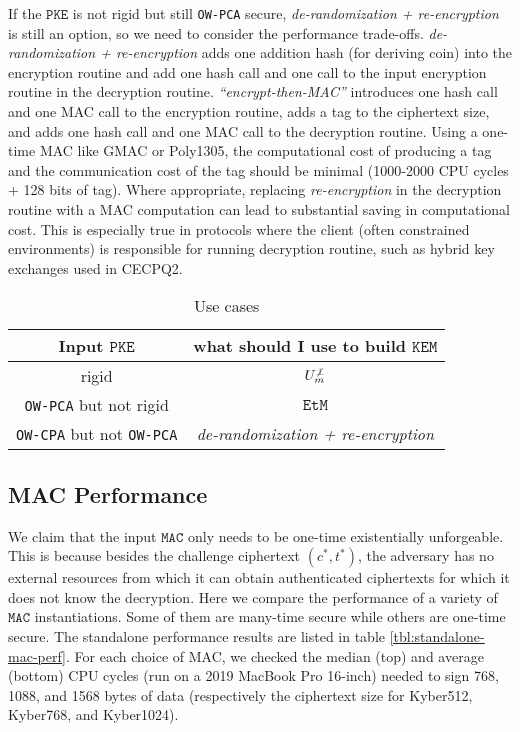 \documentclass[floatrow,journal=tches,submission]{iacrtrans}
\newcommand{\monospace}{\texttt}
\newcommand{\pke}{\monospace{PKE}}
\newcommand{\kem}{\monospace{KEM}}
\newcommand{\etm}{\monospace{EtM}}  %
\newcommand{\mac}{\monospace{MAC}}
\begin{document}
If the $\pke$ is not rigid but still \monospace{OW-PCA} secure, \emph{de-randomization + re-encryption} is still an option, so we need to consider the performance trade-offs. \emph{de-randomization + re-encryption} adds one addition hash (for deriving coin) into the encryption routine and add one hash call and one call to the input encryption routine in the decryption routine. \emph{``encrypt-then-MAC''} introduces one hash call and one MAC call to the encryption routine, adds a tag to the ciphertext size, and adds one hash call and one MAC call to the decryption routine. Using a one-time MAC like GMAC or Poly1305, the computational cost of producing a tag and the communication cost of the tag should be minimal (1000-2000 CPU cycles + 128 bits of tag). Where appropriate, replacing \emph{re-encryption} in the decryption routine with a MAC computation can lead to substantial saving in computational cost. This is especially true in protocols where the client (often constrained environments) is responsible for running decryption routine, such as hybrid key exchanges used in CECPQ2.

\begin{table}[H]
    \begin{tabular}{|c|c|}
        \hline
        Input $\pke$ & what should I use to build $\kem$ \\
        \hline
        rigid & $U^{\not\bot}_m$ \\
        \hline
        \monospace{OW-PCA} but not rigid & $\etm$ \\
        \hline
        \monospace{OW-CPA} but not \monospace{OW-PCA} & \emph{de-randomization + re-encryption} \\
        \hline
    \end{tabular}
    \caption{Use cases}
\end{table}

\subsection{MAC Performance}\label{sec:mac-performance}
We claim that the input $\mac$ only needs to be one-time existentially unforgeable. This is because besides the challenge ciphertext $(c^\ast, t^\ast)$, the adversary has no external resources from which it can obtain authenticated ciphertexts for which it does not know the decryption. Here we compare the performance of a variety of $\mac$ instantiations. Some of them are many-time secure while others are one-time secure. The standalone performance results are listed in table \ref{tbl:standalone-mac-perf}. For each choice of MAC, we checked the median (top) and average (bottom) CPU cycles (run on a 2019 MacBook Pro 16-inch) needed to sign 768, 1088, and 1568 bytes of data (respectively the ciphertext size for Kyber512, Kyber768, and Kyber1024).
\end{document}
